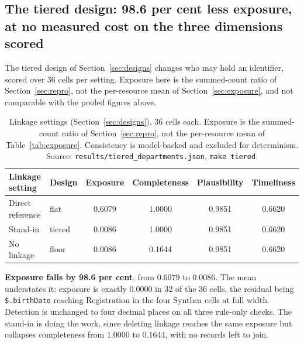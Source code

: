 \subsection{The tiered design: 98.6 per cent less exposure, at no measured cost on the three
dimensions scored}
\label{sec:tiered}

The tiered design of Section~\ref{sec:designs} changes who may hold an identifier, scored over 36
cells per setting. Exposure here is the summed-count ratio of Section~\ref{sec:repro}, not the
per-resource mean of Section~\ref{sec:exposure}, and not comparable with the pooled figures above.

\begin{table}[htbp]
\centering
{}\small
\caption{Linkage settings (Section~\ref{sec:designs}), 36 cells each. Exposure is the summed-count
ratio of Section~\ref{sec:repro}, not the per-resource mean of Table~\ref{tab:exposure}. Consistency
is model-backed and excluded for determinism.
Source: \texttt{results/tiered\_departments.json}, \texttt{make tiered}.}
\label{tab:tiered}
\begin{tabular}{llcccc}
\toprule
Linkage setting & Design & Exposure & Completeness & Plausibility & Timeliness \\
\midrule
Direct reference & flat & 0.6079 & 1.0000 & 0.9851 & 0.6620 \\
Stand-in & tiered & $\mathbf{0.0086}$ & 1.0000 & 0.9851 & 0.6620 \\
No linkage & floor & 0.0086 & 0.1644 & 0.9851 & 0.6620 \\
\bottomrule
\end{tabular}
\end{table}

\textbf{Exposure falls by 98.6 per cent}, from $0.6079$ to $0.0086$. The mean understates it:
exposure is exactly $0.0000$ in 32 of the 36 cells, the residual being \texttt{\$.birthDate}
reaching Registration in the four Synthea cells at full width. Detection is unchanged to four
decimal places on all three rule-only checks. The stand-in is doing the work, since deleting linkage
reaches the same exposure but collapses completeness from $1.0000$ to $0.1644$, with no records left
to join.

